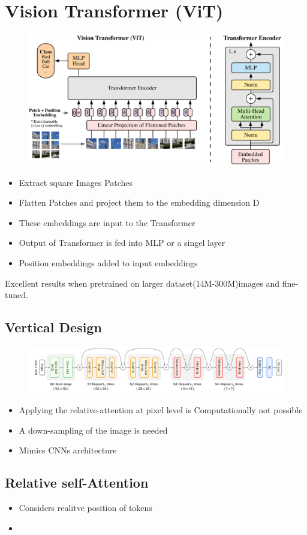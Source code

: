 \section{Vision Transformer (ViT)}
\begin{figure}[]
    \includegraphics[width=\columnwidth]{figures/VisionTransformer/ViT.png}
\end{figure}
\begin{itemize}
    \item Extract square Images Patches
    \item Flatten Patches and project them to the embedding dimension D
    \item These embeddings are input to the Transformer
    \item Output of Transformer is fed into MLP or a singel layer
    \item Position embeddings added to input embeddings
\end{itemize}

Excellent results when pretrained on larger dataset(14M-300M)images and fine-tuned.

\subsection{Vertical Design}
\begin{figure}[!h]
    \includegraphics[width=\columnwidth]{figures/VisionTransformer/verticalDesign.png}
\end{figure}
\begin{itemize}
    \item Applying the relative-attention at pixel level is Computationally not possible
    \item A down-sampling of the image is needed
    \item Mimics CNNs architecture
\end{itemize}
\subsection{Relative self-Attention}
\begin{itemize}
    \item Considers realitve position of tokens
    \item  
\end{itemize}